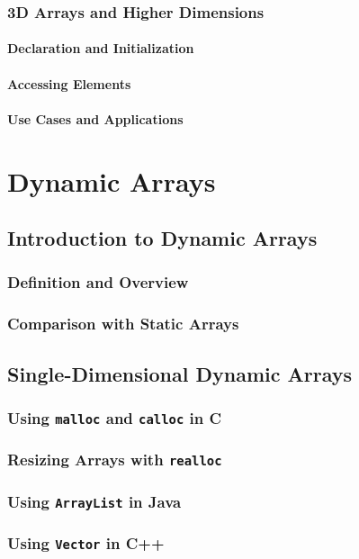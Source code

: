 \documentclass[12pt, oneside]{book}
\begin{document}
	\subsection{3D Arrays and Higher Dimensions}
	\subsubsection{Declaration and Initialization}
	\subsubsection{Accessing Elements}
	\subsubsection{Use Cases and Applications}
\chapter{Dynamic Arrays}
	\section{Introduction to Dynamic Arrays}
	\subsection{Definition and Overview}
	\subsection{Comparison with Static Arrays}
	
	\section{Single-Dimensional Dynamic Arrays}
	\subsection{Using \texttt{malloc} and \texttt{calloc} in C}
	\subsection{Resizing Arrays with \texttt{realloc}}
	\subsection{Using \texttt{ArrayList} in Java}
	\subsection{Using \texttt{Vector} in C++}
\end{document}
